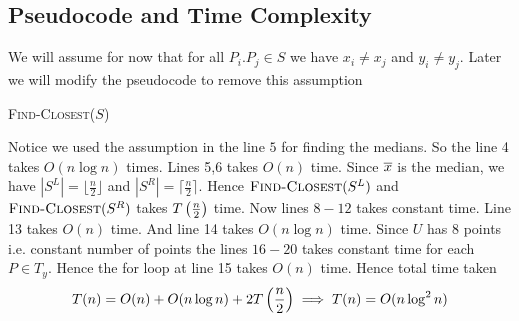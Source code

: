 \subsection{Pseudocode and Time Complexity}
\begin{assumption*}
	We will assume for now that for all $P_i.P_j\in S$ we have $x_i\neq x_j$ and $y_i\neq y_j$. Later we will modify the pseudocode to remove this assumption
\end{assumption*}
\begin{algorithm}
	\DontPrintSemicolon

	\caption{\textsc{Find-Closest}($S$)}
	\label{find-closest-nlog2n}
\end{algorithm}

Notice we used the assumption in the line $5$ for finding the medians. So the line 4 takes $O(n\log n)$ times. Lines 5,6 takes $O(n)$ time. Since $\overline{x}$ is the median, we have  $|S^L|=\lfloor \frac{n}2\rfloor$ and $|S^R|=\lceil \frac{n}{2}\rceil$. Hence $\textsc{Find-Closest}(S^L)$ and $\textsc{Find-Closest}(S^R)$ takes $T\left(\frac{n}{2}\right)$ time. Now lines $8-12$ takes constant time. Line 13 takes $O(n)$ time. And line 14 takes $O(n\log n)$ time. Since $U$ has 8 points i.e. constant number of points the lines $16-20$ takes constant time for each $P\in T_y$. Hence the for loop at line 15 takes $O(n)$ time. Hence total time taken $$T(n)=O(n)+O(n\log n)+2T\left(\frac{n}2\right)\implies T(n)=O(n\log^2n)$$
